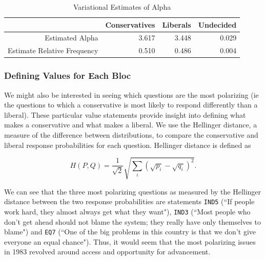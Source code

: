 \documentclass{article}\usepackage[]{graphicx}\usepackage[]{color}
\begin{document}
\begin{table}[ht]
\centering
\begin{tabular}{rrrr}
  \hline
 & Conservatives & Liberals & Undecided \\ 
  \hline
Estimated Alpha & 3.617 & 3.448 & 0.029 \\ 
  Estimate Relative Frequency & 0.510 & 0.486 & 0.004 \\ 
   \hline
\end{tabular}
\caption{Variational Estimates of Alpha} 
\end{table}


\subsubsection{Defining Values for Each Bloc}
We might also be interested in seeing which questions are the most polarizing (ie the questions to which a conservative is most likely to respond differently than a liberal). These particular value statements provide insight into defining what makes a conservative and what makes a liberal. We use the Hellinger distance, a measure of the difference between distributions, to compare the conservative and liberal response probabilities for each question. Hellinger distance is defined as

\begin{equation}
H(P,Q) = \frac{1}{\sqrt{2}}\sqrt{\sum_i \left(\sqrt{p_i} - \sqrt{q_i}\right)^2}.
\end{equation}

We can see that the three most polarizing questions as measured by the Hellinger distance between the two response probabilities are statements \texttt{IND5} (``If people work hard, they almost always get what they want"), \texttt{IND3} (``Most people who don't get ahead should not blame the system; they really have only themselves to blame") and \texttt{EQ7} (``One of the big problems in this country is that we don't give everyone an equal chance"). Thus, it would seem that the most polarizing issues in 1983 revolved around access and opportunity for advancement.
\end{document}
